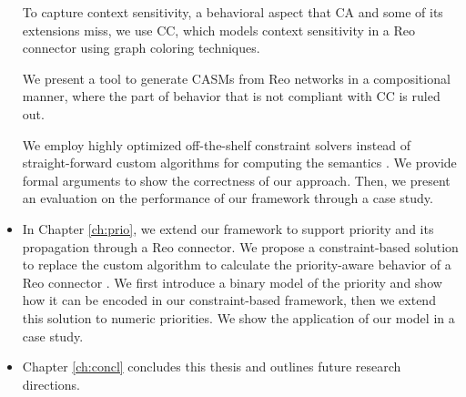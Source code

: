 \begin{itemize}
To capture context sensitivity, a behavioral aspect that CA and some of its extensions miss, we use CC, which models context sensitivity in a Reo connector using graph coloring techniques.

We present a tool to generate CASMs from Reo networks in a compositional manner, where the part of behavior that is not compliant with CC is ruled out. 

We employ highly optimized off-the-shelf constraint solvers instead of straight-forward custom algorithms for computing the semantics \cite{behconstraint}. We provide formal arguments to show the correctness of our approach. Then, we present an evaluation on the performance of our framework through a case study.
%

\item In Chapter \ref{ch:prio}, we extend our framework to support priority and its propagation through a Reo connector. We propose a constraint-based solution to replace the custom algorithm to calculate the priority-aware behavior of a Reo connector \cite{fsen19}. We first introduce a binary model of the priority and show how it can be encoded in our constraint-based framework, then we extend this solution to numeric priorities. We show the application of our model in a case study.

\item Chapter \ref{ch:concl} concludes this thesis and outlines future research directions. 
\end{itemize}

